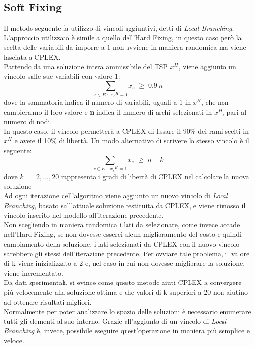 \subsection{Soft Fixing}\label{soft_fixing}
Il metodo seguente fa utilizzo di vincoli aggiuntivi, detti di \textit{Local Branching}\cite{local_branching}. L'approccio utilizzato è simile a quello dell'Hard Fixing, in questo caso però la scelta delle variabili da imporre a $1$ non avviene in maniera randomica ma viene lasciata a CPLEX.\\
Partendo da una soluzione intera ammissibile del TSP $x^H$, viene aggiunto un vincolo sulle sue variabili con valore $1$:\\
$$\underset{e\in E\; : \; {x_e}^{H}=1}\sum{x_e}\;\geq\; 0.9\;n$$
dove la sommatoria indica il numero di variabili, uguali a $1$ in $x^H$, che non cambieranno il loro valore e \textbf{n} indica il numero di archi selezionati in $x^H$, pari al numero di nodi.\\
In questo caso, il vincolo permetterà a CPLEX di fissare il 90\% dei rami scelti in $x^H$ e avere il 10\% di libertà.
Un modo alternativo di scrivere lo stesso vincolo è il seguente:
$$\underset{e\in E\; : \; {x_e}^{H}=1}\sum{x_e}\;\geq\; n-k$$
dove $k\;=\;2,...,20$ rappresenta i gradi di libertà di CPLEX nel calcolare la nuova soluzione.\\
Ad ogni iterazione dell'algoritmo viene aggiunto un nuovo vincolo di \textit{Local Branching}, basato sull'attuale soluzione restituita da CPLEX, e viene rimosso il vincolo inserito nel modello all'iterazione precedente.\\
Non scegliendo in maniera randomica i lati da selezionare, come invece accade nell'Hard Fixing, se non dovesse esserci alcun miglioramento del costo e quindi cambiamento della soluzione, i lati selezionati da CPLEX con il nuovo vincolo sarebbero gli stessi dell'iterazione precedente. Per ovviare tale problema, il valore di k viene inizializzato a 2 e, nel caso in cui non dovesse migliorare la soluzione, viene incrementato.\\
Da dati sperimentali, si evince come questo metodo aiuti CPLEX a convergere più velocemente alla soluzione ottima e che valori di k superiori a 20 non aiutino ad ottenere risultati migliori.\\
Normalmente per poter analizzare lo spazio delle soluzioni è necessario enumerare tutti gli elementi al suo interno. Grazie all'aggiunta di un vincolo di \textit{Local Branching} è, invece, possibile eseguire quest'operazione in maniera più semplice e veloce.\\ 
